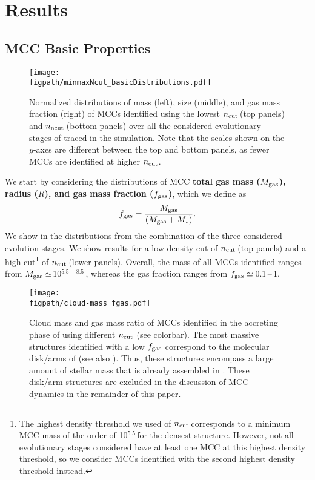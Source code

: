 \IfFileExists{emulateapjlegacy.cls}{\documentclass[iop]{emulateapjlegacy}}{\documentclass[iop]{emulateapj}}
\def\figpath{./Fig}
\begin{document}
\section{Results}\label{sec:results}

\subsection{MCC Basic Properties} \label{sec:dist}
\begin{figure*}[htbp]
\centering
\texttt{[image: \\figpath/minmaxNcut\_basicDistributions.pdf]}
\caption{Normalized distributions of mass (left), size (middle), and gas mass fraction (right) of MCCs identified using the lowest $n_{\rm cut}$\,\cc (top panels) and $n_{\rm ncut}$\,\cc (bottom panels) over all the considered evolutionary stages of \flower traced in the simulation. Note that the scales shown on the $y$-axes are different between the top and bottom panels, as fewer MCCs are identified at higher $n_{\rm cut}$.
\label{fig:dist}}
\end{figure*}

We start by considering the distributions of MCC {\bf total gas mass ($M_{\rm gas}$), radius ($R$), and gas mass fraction ($f_{\rm gas}$)},
which we define as
\begin{equation}
f_{\rm gas} = \frac{M_{\rm gas}} {\left(M_{\rm gas} + M_\star\right)}.
\end{equation}
%
We show in  the distributions from the combination of the three considered evolution stages. We show results for a low density cut of $n_{\rm cut}$\,\cc (top panels) and a high cut\footnote{The highest density threshold we used of $n_{\rm cut}$\,\cc corresponds to a minimum MCC mass of the order of 10$^{5.5}$\,\Msun for the densest structure. However, not all evolutionary stages considered have at least one MCC at this highest density threshold, so we consider MCCs identified with the second highest density threshold instead.} of $n_{\rm cut}$\,\cc (lower panels).
%
Overall, the mass of all MCCs identified ranges from $M_{\rm gas}\simeq$10$^{5.5-8.5}$\,\Msun,
whereas the gas fraction ranges from $f_{\rm gas} \simeq$\,0.1\,--\,1.

\begin{figure}
\centering
\texttt{[image: \\figpath/cloud-mass\_fgas.pdf]}
\caption{Cloud mass and gas mass ratio of MCCs identified in the accreting phase of \flower using different $n_{\rm cut}$ (see colorbar). The most massive structures identified with a low $f_{\rm gas}$ correspond to the molecular disk/arms of \flower (see also ).
%
Thus, these structures encompass a large amount of stellar mass that is already assembled in \flower. These disk/arm structures are excluded in the discussion of MCC dynamics in the remainder of this paper.
\label{fig:stellarRatio16}}
\end{figure}
\end{document}
